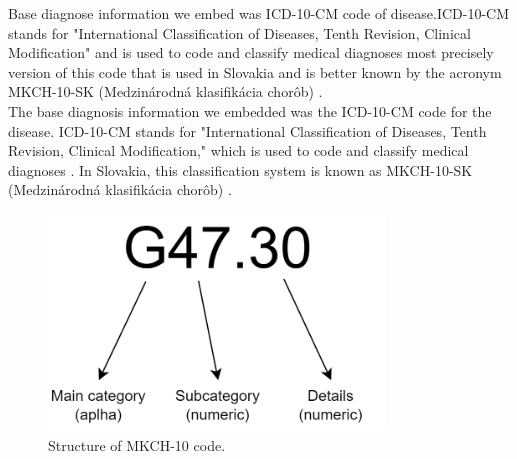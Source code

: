 Base diagnose information we embed was ICD-10-CM code of disease.ICD-10-CM stands for "International Classification of Diseases, Tenth Revision, Clinical Modification" and is used to code and classify medical diagnoses \cite{cdcICD10CM} most precisely version of this code that is used in Slovakia and is better known by the acronym MKCH-10-SK (Medzinárodná klasifikácia chorôb) \cite{ncziMKCH}.
\\

The base diagnosis information we embedded was the ICD-10-CM code for the disease. ICD-10-CM stands for "International Classification of Diseases, Tenth Revision, Clinical Modification," which is used to code and classify medical diagnoses \cite{cdcICD10CM}. In Slovakia, this classification system is known as MKCH-10-SK (Medzinárodná klasifikácia chorôb) \cite{ncziMKCH}.
\\

\begin{figure}[!h]
	\centering
	
	\includegraphics[width=0.8\textwidth]{images/ICD-10-CM.png}
	
	\caption{Structure of MKCH-10 code.}
	\label{fig:icd-10-cm}
\end{figure}

